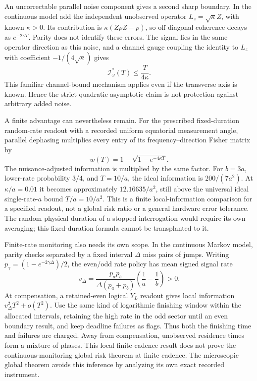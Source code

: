 \documentclass[11pt,a4paper]{article}
\numberwithin{equation}{section}
\theoremstyle{remark}
\begin{document}
An uncorrectable parallel noise component gives a second sharp boundary.
In the continuous model add the independent unobserved operator
$L_z=\sqrt\kappa Z$, with known $\kappa>0$. Its contribution is
$\kappa(Z\rho Z-\rho)$, so off-diagonal coherence decays as
$e^{-2\kappa T}$. Parity does not identify these errors. The signal lies in
the same operator direction as this noise, and a channel gauge coupling the
identity to $L_z$ with coefficient $-1/(4\sqrt\kappa)$ gives
\begin{equation}
 \mathcal I_\omega^{*}(T)\le\frac{T}{4\kappa}.
\end{equation}
This familiar channel-bound mechanism applies even if the transverse axis
is known. Hence the strict quadratic asymptotic claim is not protection
against arbitrary added noise.

A finite advantage can nevertheless remain. For the prescribed fixed-duration
random-rate readout with a recorded uniform equatorial measurement angle,
parallel dephasing multiplies every entry of its frequency--direction Fisher
matrix by
\begin{equation}
 w(T)=1-\sqrt{1-e^{-4\kappa T}}.
\end{equation}
The nuisance-adjusted information is multiplied by the same factor. For
$b=3a$, lower-rate probability $3/4$, and $T=10/a$, the ideal information is
$200/(7a^2)$. At $\kappa/a=0.01$ it becomes approximately $12.16635/a^2$,
still above the universal ideal single-rate-$a$ bound $T/a=10/a^2$.
This is a finite local-information comparison for a specified readout, not
a global risk ratio or a general hardware error tolerance. The random
physical duration of a stopped interrogation would require its own
averaging; this fixed-duration formula cannot be transplanted to it.

Finite-rate monitoring also needs its own scope. In the continuous Markov
model, parity checks separated by a fixed interval $\Delta$ miss pairs of
jumps. Writing $p_\gamma=(1-e^{-2\gamma\Delta})/2$, the even/odd rate policy
has mean signed signal rate
\begin{equation}
 v_\Delta=\frac{p_ap_b}{\Delta(p_a+p_b)}
 \left(\frac1a-\frac1b\right)>0.
\end{equation}
At compensation, a retained-even logical $Y_L$ readout gives local information
$v_\Delta^2T^2+o(T^2)$. Use the same kind of logarithmic finishing window
within the allocated intervals, retaining the high rate in the odd sector
until an even boundary result, and keep deadline failures as flags.
Thus both the finishing time and failures are charged. Away from
compensation, unobserved residence times form a mixture of phases. This
local finite-cadence result does not prove the continuous-monitoring global
risk theorem at finite cadence. The microscopic global theorem avoids this
inference by analyzing its own exact recorded instrument.
\end{document}
